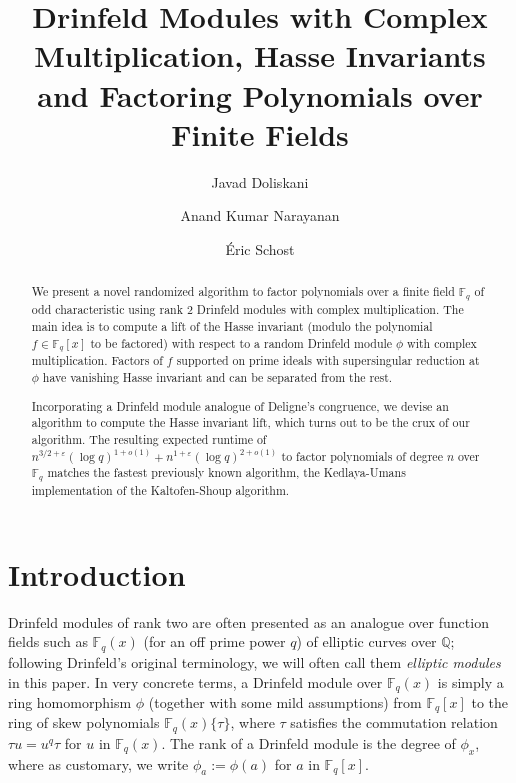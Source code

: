 \documentclass[12pt]{article}
\title{Drinfeld Modules with Complex Multiplication, Hasse Invariants and Factoring Polynomials over Finite Fields}
\author[1]{Javad Doliskani}
\author[2]{Anand Kumar Narayanan}
\author[3]{\'Eric Schost}
\affil[1]{\small Institute for Quantum Computing, University of Waterloo}
\affil[2]{\small Computing and Mathematical Sciences, Caltech}
\affil[3]{\small Cheriton Schoold of Computer Science, University of Waterloo}
\date{}
\theoremstyle{plain}
\theoremstyle{definition}
\newcommand{\ang}[1]{\{#1\}}
\def\Q{\ensuremath{\mathbb{Q}}}
\def\F{\ensuremath{\mathbb{F}}}
\begin{document}
\maketitle

\begin{abstract}
\noindent 
We present a novel randomized algorithm to factor polynomials over a
finite field $\F_q$ of odd characteristic using rank $2$ Drinfeld
modules with complex multiplication. The main idea is to compute a
lift of the Hasse invariant (modulo the polynomial $f \in \F_q[x]$
to be factored) with respect to a random Drinfeld module $\phi$ with
complex multiplication. Factors of $f$ supported on prime ideals
with supersingular reduction at $\phi$ have vanishing Hasse invariant
and can be separated from the rest.

Incorporating a Drinfeld module analogue of Deligne's congruence, we
devise an algorithm to compute the Hasse invariant lift, which
turns out to be the crux of our algorithm. The resulting expected
runtime of $n^{3/2+\varepsilon} (\log q)^{1+o(1)}+n^{1+\varepsilon} (\log
q)^{2+o(1)}$ to factor polynomials of degree $n$ over $\F_q$ matches
the fastest previously known algorithm, the Kedlaya-Umans
implementation of the Kaltofen-Shoup algorithm.
\end{abstract}

\section{Introduction}

Drinfeld modules of rank two are often presented as an analogue over
function fields such as $\F_q(x)$ (for an off prime power $q$) of elliptic
curves over $\Q$; following Drinfeld's original terminology,
we will often call them {\em elliptic modules} in this paper. In very
concrete terms, a Drinfeld module over $\F_q(x)$ is simply a ring
homomorphism $\phi$ (together with some mild assumptions) from
$\F_q[x]$ to the ring of skew polynomials $\F_q(x)\ang{\tau}$, where
$\tau$ satisfies the commutation relation $\tau u = u^q \tau$ for $u$
in $\F_q(x)$. The rank of a Drinfeld module is the degree of
$\phi_x$, where as customary, we write $\phi_a:=\phi(a)$ for $a$ in $\F_q[x]$.
\end{document}
